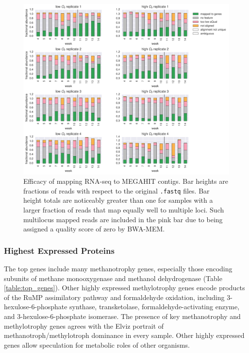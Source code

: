 \begin{figure}[H]
\centering
    \includegraphics[width=1.0\textwidth]{./tex/chapter2/figures/170316_fracs_mapped_unmapped_etc.pdf}
    \begin{singlespace}
    \caption[Efficacy of mapping RNA-seq to MEGAHIT contigs]{
        Efficacy of mapping RNA-seq to MEGAHIT contigs.
        Bar heights are fractions of reads with respect to the original \texttt{.fastq} files.
        Bar height totals are noticeably greater than one for samples with a larger fraction of reads that map equally well to multiple loci.
        Such multilocus mapped reads are included in the pink bar due to being assigned a quality score of zero by BWA-MEM.
        }
    \label{fig:rna_mapping_bars}
    \end{singlespace}
\end{figure}

\subsubsection{Highest Expressed Proteins}    %

The top genes include many methanotrophy genes, especially those encoding subunits of methane monooxygenase and methanol dehydrogenase (Table \ref{table:top_genes}).
Other highly expressed methylotrophy genes encode products of the RuMP assimilatory pathway and formaldehyde oxidation, including 3-hexulose-6-phosphate synthase, transketolase, formaldehyde-activating enzyme, and 3-hexulose-6-phosphate isomerase.
The presence of key methanotrophy and methylotrophy genes agrees with the Elviz portrait of methanotroph/methylotroph dominance in every sample.
Other highly expressed genes allow speculation for metabolic roles of other organisms.


